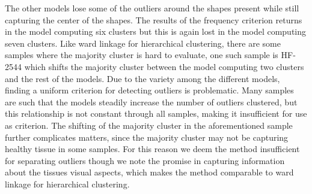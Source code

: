 The other models lose some of the outliers around the shapes present while still capturing the center of the shapes. The results of the frequency criterion returns in the model computing six clusters but this is again lost in the model computing seven clusters. Like ward linkage for hierarchical clustering, there are some samples where the majority cluster is hard to evaluate, one such sample is HF-2544 which shifts the majority cluster between the model computing two clusters and the rest of the models. Due to the variety among the different models, finding a uniform criterion for detecting outliers is problematic. Many samples are such that the models steadily increase the number of outliers clustered, but this relationship is not constant through all samples, making it insufficient for use as criterion. The shifting of the majority cluster in the aforementioned sample further complicates matters, since the majority cluster may not be capturing healthy tissue in some samples. For this reason we deem the method insufficient for separating outliers though we note the promise in capturing information about the tissues visual aspects, which makes the method comparable to ward linkage for hierarchical clustering.


